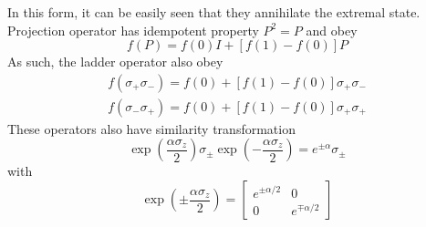 \documentclass[../../../main.tex]{subfiles}
\begin{document}
In this form, it can be easily seen that they annihilate the extremal state.
Projection operator has idempotent property $P^2=P$ and obey
\begin{equation*}
    f(P) = f(0)I + [f(1) - f(0)]P
\end{equation*}
As such, the ladder operator also obey
\begin{gather*}
    f(\sigma_+\sigma_-) = f(0) + [f(1) - f(0)]\sigma_+\sigma_-    \\
    f(\sigma_-\sigma_+) = f(0) + [f(1) - f(0)]\sigma_+\sigma_+
\end{gather*}
These operators also have similarity transformation
\begin{equation*}
    \exp \left( \frac{\alpha \sigma_z}{2} \right)  \sigma_\pm \exp \left(- \frac{\alpha \sigma_z}{2} \right)  = e^{\pm\alpha} \sigma_\pm
\end{equation*}
with
\begin{equation*}
    \exp \left(\pm \frac{\alpha \sigma_z}{2}  \right)
    = \begin{bmatrix}
        e^{\pm\alpha/2} & 0               \\
        0               & e^{\mp\alpha/2}
    \end{bmatrix}
\end{equation*}
\end{document}
